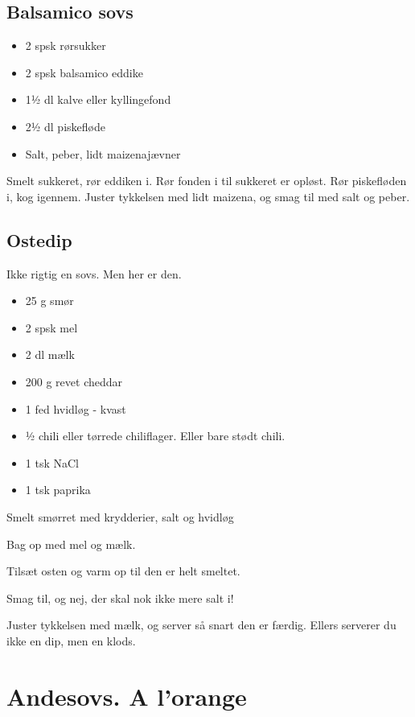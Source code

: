 \documentclass[
]{book}
\providecommand{\tightlist}{%
  \setlength{\itemsep}{0pt}\setlength{\parskip}{0pt}}
\begin{document}
\hypertarget{balsamico-sovs}{%
\subsection{Balsamico sovs}\label{balsamico-sovs}}

\begin{itemize}
\tightlist
\item
  2 spsk rørsukker
\item
  2 spsk balsamico eddike
\item
  1½ dl kalve eller kyllingefond
\item
  2½ dl piskefløde
\item
  Salt, peber, lidt maizenajævner
\end{itemize}

Smelt sukkeret, rør eddiken i. Rør fonden i til sukkeret er opløst. Rør piskefløden i, kog igennem. Juster tykkelsen med lidt maizena, og smag til med salt og peber.

\hypertarget{ostedip}{%
\subsection{Ostedip}\label{ostedip}}

Ikke rigtig en sovs. Men her er den.

\begin{itemize}
\tightlist
\item
  25 g smør
\item
  2 spsk mel
\item
  2 dl mælk
\item
  200 g revet cheddar
\item
  1 fed hvidløg - kvast
\item
  ½ chili eller tørrede chiliflager. Eller bare stødt chili.
\item
  1 tsk NaCl
\item
  1 tsk paprika
\end{itemize}

Smelt smørret med krydderier, salt og hvidløg

Bag op med mel og mælk.

Tilsæt osten og varm op til den er helt smeltet.

Smag til, og nej, der skal nok ikke mere salt i!

Juster tykkelsen med mælk, og server så snart den er færdig. Ellers serverer du ikke en dip, men en klods.

\hypertarget{andesovs.-a-lorange}{%
\section{Andesovs. A l'orange}\label{andesovs.-a-lorange}}
\end{document}
